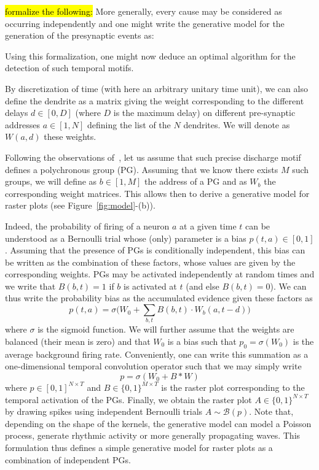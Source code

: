 \documentclass[default]{sn-jnl}%
\theoremstyle{thmstyleone}%
\theoremstyle{thmstyletwo}%
\theoremstyle{thmstylethree}%
\newcommand{\note}[1]{{\sethlcolor{yellow}\hl{#1}}}
\begin{document}
\note{formalize the following:}
More generally, every cause may be considered as occurring independently and one might write the generative model for the generation of the presynaptic events as:


Using this formalization, one might now deduce an optimal algorithm for the detection of such temporal motifs.


By discretization of time (with here an arbitrary unitary time unit), we can also define the dendrite as a matrix giving the weight corresponding to the different delays $d \in [0, D]$ (where $D$ is the maximum delay) on different pre-synaptic addresses $a \in [1, N]$ defining the list of the $N$ dendrites. We will denote as $W(a, d)$ these weights.


Following the observations of~\citet{izhikevich_polychronization_2006}, let us assume that such precise discharge motif defines a polychronous group (PG). Assuming that we know there exists $M$ such groups, we will define as $b \in [1, M]$ the address of a PG and as $W_b$ the corresponding weight matrices. This allows then to derive a generative model for raster plots (see Figure~\ref{fig:model}-(b)).



Indeed, the probability of firing of a neuron $a$ at a given time $t$ can be understood as a Bernoulli trial whose (only) parameter is a bias $p(t, a) \in [0, 1]$. Assuming that the presence of PGs is conditionally independent, this bias can be written as the combination of these factors, whose values are given by the corresponding weights. PGs may be activated independently at random times and  we write that $B(b, t)=1$ if $b$ is activated at $t$ (and else $B(b, t)=0$). We can thus write the probability bias as the accumulated evidence given these factors as 
\begin{equation*}
p(t, a) = \sigma\big(W_0 + \sum_{b, t} B(b, t) \cdot W_b(a, t-d) \big)  
\end{equation*}
where $\sigma$ is the sigmoid function. We will further assume that the weights are balanced (their mean is zero) and that $W_0$ is a bias such that $p_0=\sigma(W_0)$ is the average background firing rate. Conveniently, one can write this summation as a one-dimensional temporal convolution operator such that we may simply write
\begin{equation*}
p = \sigma(W_0 + B \ast W )
\end{equation*}
where  $p\in [ 0, 1]^{N\times T}$ and $B\in \{0, 1\}^{M\times T}$ is the raster plot corresponding to the temporal activation of the PGs. Finally, we obtain the raster plot $A\in \{0, 1\}^{N\times T}$ by drawing spikes using independent Bernoulli trials $A \sim \mathcal{B}(p)$. Note that, depending on the shape of the kernels, the generative model can model a Poisson process, generate rhythmic activity or more generally propagating waves. This formulation thus defines a simple generative model for raster plots as a combination of independent PGs. 
\end{document}
